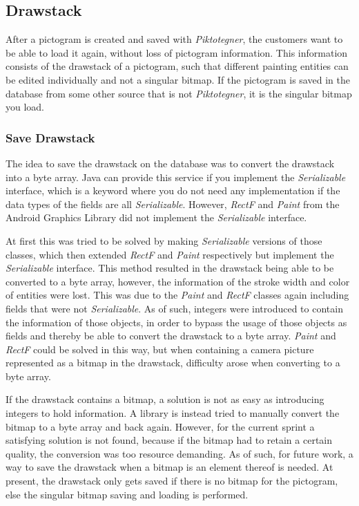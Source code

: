 \subsection{Drawstack}
After a pictogram is created and saved with \textit{Piktotegner}, the customers want to be able to load it again, without loss of pictogram information.
This information consists of the drawstack of a pictogram, such that different painting entities can be edited individually and not a singular bitmap.
If the pictogram is saved in the database from some other source that is not \textit{Piktotegner}, it is the singular bitmap you load.

\subsubsection*{Save Drawstack}
The idea to save the drawstack on the database was to convert the drawstack into a byte array.
Java can provide this service if you implement the \textit{Serializable} interface, which is a keyword where you do not need any implementation if the data types of the fields are all \textit{Serializable}.
However, \textit{RectF} and \textit{Paint} from the Android Graphics Library did not implement the \textit{Serializable} interface.

At first this was tried to be solved by making \textit{Serializable} versions of those classes, which then extended \textit{RectF} and \textit{Paint} respectively but implement the \textit{Serializable} interface.
This method resulted in the drawstack being able to be converted to a byte array, however, the information of the stroke width and color of entities were lost.
This was due to the \textit{Paint} and \textit{RectF} classes again including fields that were not \textit{Serializable}.
As of such, integers were introduced to contain the information of those objects, in order to bypass the usage of those objects as fields and thereby be able to convert the drawstack to a byte array.
\textit{Paint} and \textit{RectF} could be solved in this way, but when containing a camera picture represented as a bitmap in the drawstack, difficulty arose when converting to a byte array.

If the drawstack contains a bitmap, a solution is not as easy as introducing integers to hold information.
A library is instead tried to manually convert the bitmap to a byte array and back again.
However, for the current sprint a satisfying solution is not found, because if the bitmap had to retain a certain quality, the conversion was too resource demanding.
As of such, for future work, a way to save the drawstack when a bitmap is an element thereof is needed.
At present, the drawstack only gets saved if there is no bitmap for the pictogram, else the singular bitmap saving and loading is performed.


